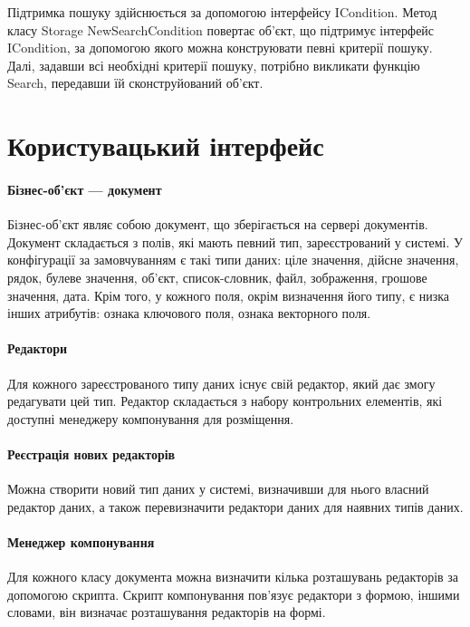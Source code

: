 \documentclass{memoir}
\begin{document}
Підтримка пошуку здійснюється за допомогою інтерфейсу ICondition. Метод класу Storage NewSearchCondition повертає об’єкт, що підтримує інтерфейс ICondition, за допомогою якого можна конструювати певні критерії пошуку. Далі, задавши всі необхідні критерії пошуку, потрібно викликати функцію Search, передавши їй сконструйований об’єкт.

\section{Користувацький інтерфейс}

\paragraph{Бізнес-об’єкт — документ}

Бізнес-об’єкт являє собою документ, що зберігається на сервері документів. Документ складається з полів, які мають певний тип, зареєстрований у системі. У конфігурації за замовчуванням є такі типи даних: ціле значення, дійсне значення, рядок, булеве значення, об’єкт, список-словник, файл, зображення, грошове значення, дата. Крім того, у кожного поля, окрім визначення його типу, є низка інших атрибутів: ознака ключового поля, ознака векторного поля.

\paragraph{Редактори}

Для кожного зареєстрованого типу даних існує свій редактор, який дає змогу редагувати цей тип. Редактор складається з набору контрольних елементів, які доступні менеджеру компонування для розміщення.

\paragraph{Реєстрація нових редакторів}

Можна створити новий тип даних у системі, визначивши для нього власний редактор даних, а також перевизначити редактори даних для наявних типів даних.

\paragraph{Менеджер компонування}

Для кожного класу документа можна визначити кілька розташувань редакторів за допомогою скрипта. Скрипт компонування пов’язує редактори з формою, іншими словами, він визначає розташування редакторів на формі.
\end{document}
